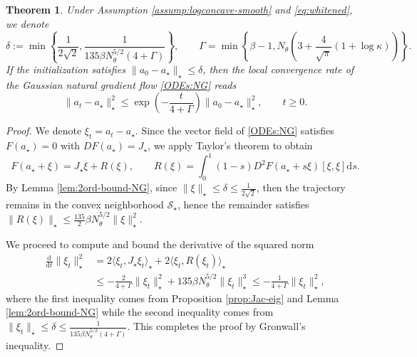 \documentclass[11pt]{article}
\theoremstyle{plain}
\newtheorem{theorem}{Theorem}[section]
\theoremstyle{definition}
\theoremstyle{remark}
\newcommand{\dd}{\mathrm{d}}
\begin{document}
\begin{theorem}\label{thm:loc-conv}
    Under Assumption \ref{assump:logconcave-smooth} and \eqref{eq:whitened}, we denote \begin{equation*}
        \delta := \min \left\{ \frac{1}{2\sqrt{2}}, \frac{1}{135 \beta N_\theta^{5/2} (4 + \Gamma)} \right\}, \qquad \Gamma = \min \left\{ \beta - 1, N_\theta \left( 3 + \frac{4}{\sqrt{\pi}} (1 + \log \kappa) \right) \right\}.
    \end{equation*}
    If the initialization satisfies $\|a_0 - a_\star\|_\star \leq \delta$, then the local convergence rate of the Gaussian natural gradient flow \eqref{ODEs:NG} reads
    \begin{equation*}
        \|a_t - a_\star\|_\star^2 \leq \exp \left(- \frac{t}{4 + \Gamma}\right) \|a_0 - a_\star \|_\star^2, \qquad t\geq 0.
    \end{equation*}
\end{theorem}

\begin{proof}
    We denote $\xi_t = a_t - a_\star$. Since the vector field of \eqref{ODEs:NG} satisfies $F(a_\star) = 0$ with $DF(a_\star) = J_\star$, we apply Taylor's theorem to obtain
    \begin{equation*}
        F(a_\star + \xi) = J_\star \xi + R(\xi), \qquad R(\xi) = \int_0^1 (1-s) D^2 F(a_\star + s\xi)[\xi, \xi] \dd s.
    \end{equation*}
    By Lemma \ref{lem:2ord-bound-NG}, since $\|\xi\|_\star \leq \delta \leq \frac{1}{2\sqrt{2}}$, then the trajectory remains in the convex neighborhood $\mathcal{S}_\star$, hence the remainder satisfies $\|R(\xi)\|_\star \le \frac{135}{2} \beta N_\theta^{5/2} \|\xi\|_\star^2$.
    
    We proceed to compute and bound the derivative of the squared norm 
    \begin{align*}
        \frac{\dd}{\dd t} \|\xi_t\|_\star^2 &= 2 \langle \xi_t, J_\star \xi_t \rangle_\star + 2 \langle \xi_t, R(\xi_t) \rangle_\star \\
        &\leq -\frac{2}{4 + \Gamma} \|\xi_t\|_\star^2 + 135 \beta N_\theta^{5/2} \|\xi_t\|_\star^3 \leq -\frac{1}{4 + \Gamma} \|\xi_t\|_\star^2,
    \end{align*}
    where the first inequality comes from Proposition \ref{prop:Jac-eig} and Lemma \ref{lem:2ord-bound-NG} while the second inequality comes from $\|\xi_t\|_\star \leq \delta \leq \frac{1}{135\beta N_\theta^{5/2} (4 + \Gamma)}$. This completes the proof by Gronwall's inequality.
\end{proof}
\end{document}
